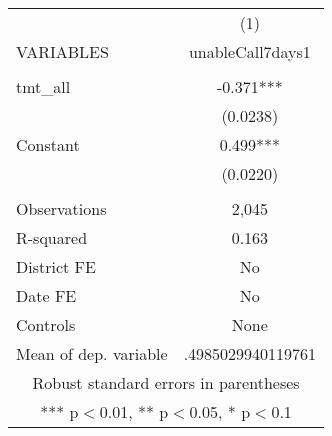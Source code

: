 \documentclass[]{article}
\begin{document}
\begin{tabular}{lc} \hline
 & (1) \\
VARIABLES & unableCall7days1 \\ \hline
 &  \\
tmt\_all & -0.371*** \\
 & (0.0238) \\
Constant & 0.499*** \\
 & (0.0220) \\
 &  \\
Observations & 2,045 \\
R-squared & 0.163 \\
District FE & No \\
Date FE & No \\
Controls & None \\
 Mean of dep. variable & .4985029940119761 \\ \hline
\multicolumn{2}{c}{ Robust standard errors in parentheses} \\
\multicolumn{2}{c}{ *** p$<$0.01, ** p$<$0.05, * p$<$0.1} \\
\end{tabular}
\end{document}
